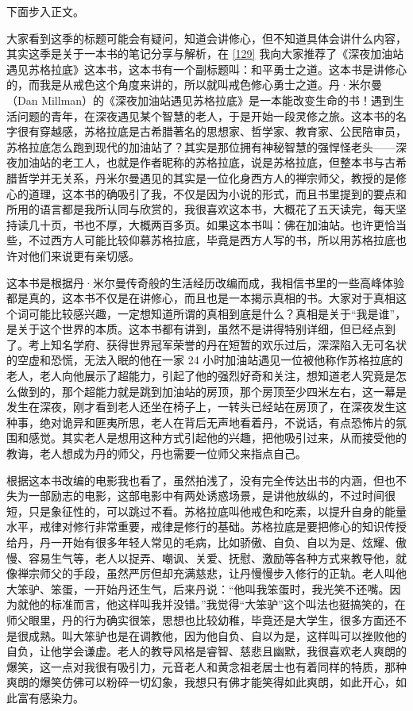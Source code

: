 下面步入正文。

大家看到这季的标题可能会有疑问，知道会讲修心，但不知道具体会讲什么内容，其实这季是关于一本书的笔记分享与解析，在 \ref{129} 我向大家推荐了《深夜加油站遇见苏格拉底》这本书，这本书有一个副标题叫：和平勇士之道。这本书是讲修心的，而我是从戒色这个角度来讲的，所以就叫戒色修心勇士之道。丹·米尔曼（Dan Millman）的《深夜加油站遇见苏格拉底》是一本能改变生命的书！遇到生活问题的青年，在深夜遇见某个智慧的老人，于是开始一段灵修之旅。这本书的名字很有穿越感，苏格拉底是古希腊著名的思想家、哲学家、教育家、公民陪审员，苏格拉底怎么跑到现代的加油站了？其实是那位拥有神秘智慧的强悍怪老头——深夜加油站的老工人，也就是作者昵称的苏格拉底，说是苏格拉底，但整本书与古希腊哲学并无关系，丹米尔曼遇见的其实是一位化身西方人的禅宗师父，教授的是修心的道理，这本书的确吸引了我，不仅是因为小说的形式，而且书里提到的要点和所用的语言都是我所认同与欣赏的，我很喜欢这本书，大概花了五天读完，每天坚持读几十页，书也不厚，大概两百多页。如果这本书叫：佛在加油站。也许更恰当些，不过西方人可能比较仰慕苏格拉底，毕竟是西方人写的书，所以用苏格拉底也许对他们来说更有亲切感。

这本书是根据丹·米尔曼传奇般的生活经历改编而成，我相信书里的一些高峰体验都是真的，这本书不仅是在讲修心，而且也是一本揭示真相的书。大家对于真相这个词可能比较感兴趣，一定想知道所谓的真相到底是什么？真相是关于“我是谁”，是关于这个世界的本质。这本书都有讲到，虽然不是讲得特别详细，但已经点到了。考上知名学府、获得世界冠军荣誉的丹在短暂的欢乐过后，深深陷入无可名状的空虚和恐慌，无法入眠的他在一家 24 小时加油站遇见一位被他称作苏格拉底的老人，老人向他展示了超能力，引起了他的强烈好奇和关注，想知道老人究竟是怎么做到的，那个超能力就是跳到加油站的房顶，那个房顶至少四米左右，这一幕是发生在深夜，刚才看到老人还坐在椅子上，一转头已经站在房顶了，在深夜发生这种事，绝对诡异和匪夷所思，老人在背后无声地看着丹，不说话，有点恐怖片的氛围和感觉。其实老人是想用这种方式引起他的兴趣，把他吸引过来，从而接受他的教诲，老人想成为丹的师父，丹也需要一位师父来指点自己。

根据这本书改编的电影我也看了，虽然拍浅了，没有完全传达出书的内涵，但也不失为一部励志的电影，这部电影中有两处诱惑场景，是讲他放纵的，不过时间很短，只是象征性的，可以跳过不看。苏格拉底叫他戒色和吃素，以提升自身的能量水平，戒律对修行非常重要，戒律是修行的基础。苏格拉底是要把修心的知识传授给丹，丹一开始有很多年轻人常见的毛病，比如骄傲、自负、自以为是、炫耀、傲慢、容易生气等，老人以捉弄、嘲讽、关爱、抚慰、激励等各种方式来教导他，就像禅宗师父的手段，虽然严厉但却充满慈悲，让丹慢慢步入修行的正轨。老人叫他大笨驴、笨蛋，一开始丹还生气，后来丹说：“他叫我笨蛋时，我光笑不还嘴。因为就他的标准而言，他这样叫我并没错。”我觉得“大笨驴”这个叫法也挺搞笑的，在师父眼里，丹的行为确实很笨，思想也比较幼稚，毕竟还是大学生，很多方面还不是很成熟。叫大笨驴也是在调教他，因为他自负、自以为是，这样叫可以挫败他的自负，让他学会谦虚。老人的教导风格是睿智、慈悲且幽默，我很喜欢老人爽朗的爆笑，这一点对我很有吸引力，元音老人和黄念祖老居士也有着同样的特质，那种爽朗的爆笑仿佛可以粉碎一切幻象，我想只有佛才能笑得如此爽朗，如此开心，如此富有感染力。

